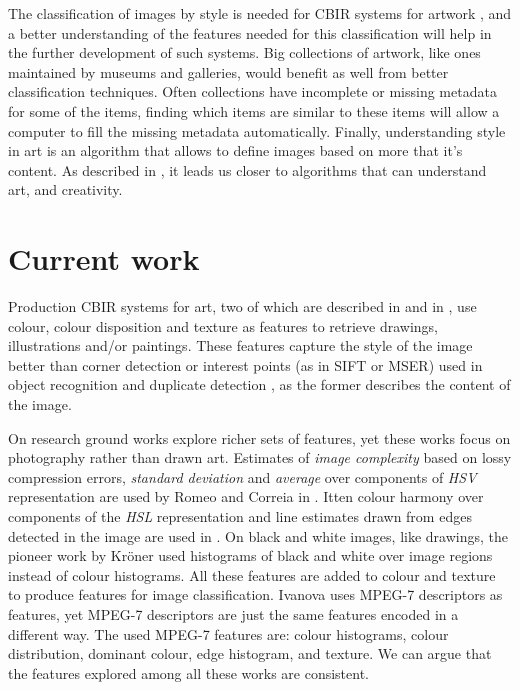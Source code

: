 \documentclass[a4paper]{article}
\begin{document}
The classification of images by style is needed for CBIR systems for artwork
\cite{cfsp12air,isv12mpeg}, and a better understanding of the features needed
for this classification will help in the further development of such systems.
Big collections of artwork, like ones maintained by museums and galleries,
would benefit as well from better classification techniques.  Often collections
have incomplete or missing metadata for some of the items, finding which items
are similar to these items will allow a computer to fill the missing metadata
automatically.  Finally, understanding style in art is an algorithm that allows
to define images based on more that it's content.  As described in
\cite{rmc12ajs}, it leads us closer to algorithms that can understand art, and
creativity.

\section{Current work}

Production CBIR systems for art, two of which are described in \cite{cfsp12air}
and in \cite{ymvz03tree}, use colour, colour disposition and texture as
features to retrieve drawings, illustrations and/or paintings.  These features
capture the style of the image better than corner detection or interest points
(as in SIFT or MSER) used in object recognition and duplicate detection
\cite{szel11book}, as the former describes the content of the image.

On research ground works explore richer sets of features, yet these works focus
on photography rather than drawn art.  Estimates of \emph{image complexity}
based on lossy compression errors, \emph{standard deviation} and \emph{average}
over components of \emph{HSV} representation are used by Romeo and Correia in
\cite{jma12clas,cmrc13fs,rmc12ajs}.  Itten colour harmony over components of
the \emph{HSL} representation and line estimates drawn from edges detected in
the image are used in \cite{mach10clas}.  On black and white images, like
drawings, the pioneer work by Kr\"oner \cite{kroner98draw} used histograms of
black and white over image regions instead of colour histograms.  All these
features are added to colour and texture to produce features for image
classification.  Ivanova \cite{isv12mpeg} uses MPEG-7 descriptors as features,
yet MPEG-7 descriptors are just the same features encoded in a different way.
The used MPEG-7 features are: colour histograms, colour distribution, dominant
colour, edge histogram, and texture.  We can argue that the features explored
among all these works are consistent.
\end{document}
